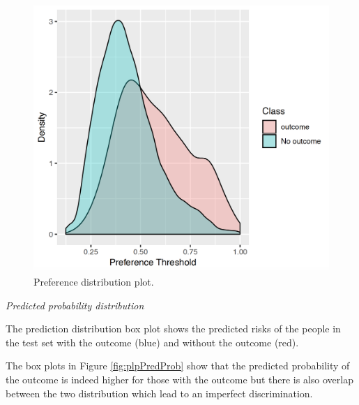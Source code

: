 \documentclass[11pt]{book}
\theoremstyle{definition}
\theoremstyle{definition}
\theoremstyle{definition}
\theoremstyle{remark}
\begin{document}
\begin{figure}

{\centering \includegraphics[width=0.9\linewidth]{images/PatientLevelPrediction/preferencePDF} 

}

\caption{Preference distribution plot.}\label{fig:plpPreference}
\end{figure}

\emph{Predicted probability distribution}

The prediction distribution box plot shows the predicted risks of the people in the test set with the outcome (blue) and without the outcome (red).

The box plots in Figure \ref{fig:plpPredProb} show that the predicted probability of the outcome is indeed higher for those with the outcome but there is also overlap between the two distribution which lead to an imperfect discrimination.
\end{document}
